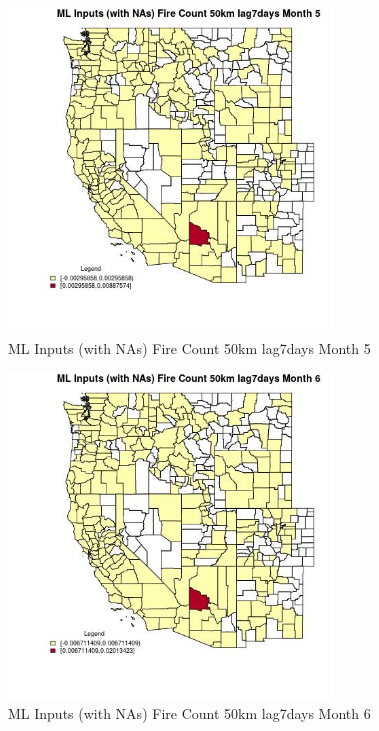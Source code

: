 \begin{figure} 
\centering  
\includegraphics[width=0.77\textwidth]{Code_Outputs/Report_ML_input_PM25_Step4_part_e_de_duplicated_aves_compiled_2019-05-20wNAs_CountyFire_Count_50km_lag7daysmedianMonth5.jpg} 
\caption{\label{fig:Report_ML_input_PM25_Step4_part_e_de_duplicated_aves_compiled_2019-05-20wNAsCountyFire_Count_50km_lag7daysmedianMonth5}ML Inputs (with NAs) Fire Count 50km lag7days Month 5} 
\end{figure} 
 

\begin{figure} 
\centering  
\includegraphics[width=0.77\textwidth]{Code_Outputs/Report_ML_input_PM25_Step4_part_e_de_duplicated_aves_compiled_2019-05-20wNAs_CountyFire_Count_50km_lag7daysmedianMonth6.jpg} 
\caption{\label{fig:Report_ML_input_PM25_Step4_part_e_de_duplicated_aves_compiled_2019-05-20wNAsCountyFire_Count_50km_lag7daysmedianMonth6}ML Inputs (with NAs) Fire Count 50km lag7days Month 6} 
\end{figure} 
 

